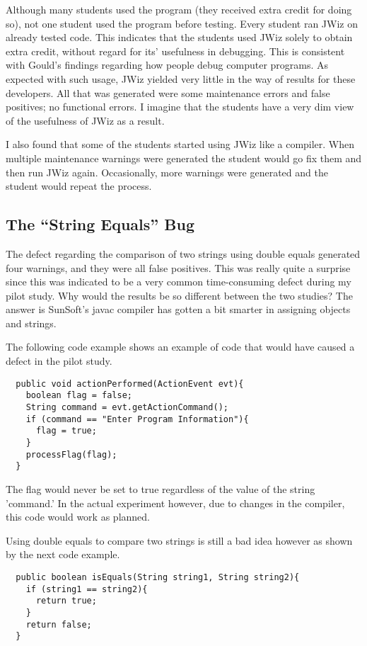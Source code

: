 Although many students used the program (they received extra credit for
doing so), not one student used the program before testing.  Every student
ran JWiz on already tested code.  This indicates that the students used
JWiz solely to obtain extra credit, without regard for its' usefulness in
debugging.  This is consistent with Gould's findings regarding how people
debug computer programs\cite{Gould73}.  As expected with such usage, JWiz
yielded very little in the way of results for these developers.  All that
was generated were some maintenance errors and false positives; no
functional errors.  I imagine that the students have a very dim view of the
usefulness of JWiz as a result.

I also found that some of the students started using JWiz like a compiler.
When multiple maintenance warnings were generated the student would go fix
them and then run JWiz again.  Occasionally, more warnings were generated
and the student would repeat the process.

\subsection{The ``String Equals'' Bug}
The defect regarding the comparison of two strings using double equals
generated four warnings, and they were all false positives.  This was
really quite a surprise since this was indicated to be a very common
time-consuming defect during my pilot study.  Why would the results be so
different between the two studies?  The answer is SunSoft's javac compiler
has gotten a bit smarter in assigning objects and strings.

The following code example shows an example of code that would have caused
a defect in the pilot study.

\begin{verbatim}
  public void actionPerformed(ActionEvent evt){
    boolean flag = false;
    String command = evt.getActionCommand();
    if (command == "Enter Program Information"){
      flag = true;
    }
    processFlag(flag);
  }
\end{verbatim}

The flag would never be set to true regardless of the value of the string
'command.'  In the actual experiment however, due to changes in the
compiler, this code would work as planned.

Using double equals to compare two strings is still a bad idea however as
shown by the next code example. 

\begin{verbatim}
  public boolean isEquals(String string1, String string2){
    if (string1 == string2){
      return true;
    }
    return false;
  }
\end{verbatim}

